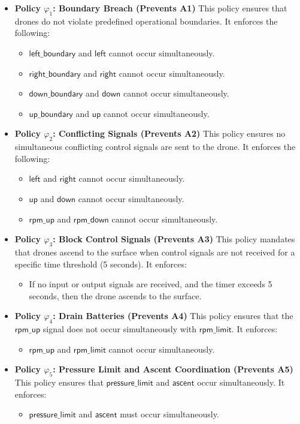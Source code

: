 \begin{itemize}
	\item \textbf{Policy $\varphi_1$: Boundary Breach (Prevents A1)}  
	This policy ensures that drones do not violate predefined operational boundaries. It enforces the following:
	\begin{itemize}
		\item $\mathsf{left\_boundary}$ and $\mathsf{left}$ cannot occur simultaneously.
		\item $\mathsf{right\_boundary}$ and $\mathsf{right}$ cannot occur simultaneously.
		\item $\mathsf{down\_boundary}$ and $\mathsf{down}$ cannot occur simultaneously.
		\item $\mathsf{up\_boundary}$ and $\mathsf{up}$ cannot occur simultaneously.
	\end{itemize}
	
	\item \textbf{Policy $\varphi_2$: Conflicting Signals (Prevents A2)}  
	This policy ensures no simultaneous conflicting control signals are sent to the drone. It enforces the following:
	\begin{itemize}
		\item $\mathsf{left}$ and $\mathsf{right}$ cannot occur simultaneously.
		\item $\mathsf{up}$ and $\mathsf{down}$ cannot occur simultaneously.
		\item $\mathsf{rpm\_up}$ and $\mathsf{rpm\_down}$ cannot occur simultaneously.
	\end{itemize}
	
	\item \textbf{Policy $\varphi_3$: Block Control Signals (Prevents A3)}  
	This policy mandates that drones ascend to the surface when control signals are not received for a specific time threshold (5 seconds). It enforces:
	\begin{itemize}
		\item If no input or output signals are received, and the timer exceeds 5 seconds, then the drone ascends to the surface.
	\end{itemize}
	
	\item \textbf{Policy $\varphi_4$: Drain Batteries (Prevents A4)}  
	This policy ensures that the $\mathsf{rpm\_up}$ signal does not occur simultaneously with $\mathsf{rpm\_limit}$. It enforces:
	\begin{itemize}
		\item $\mathsf{rpm\_up}$ and $\mathsf{rpm\_limit}$ cannot occur simultaneously.
	\end{itemize}
	
	\item \textbf{Policy $\varphi_5$: Pressure Limit and Ascent Coordination (Prevents A5)}  
	This policy ensures that $\mathsf{pressure\_limit}$ and $\mathsf{ascent}$ occur simultaneously. It enforces:
	\begin{itemize}
		\item $\mathsf{pressure\_limit}$ and $\mathsf{ascent}$ must occur simultaneously.
	\end{itemize}
\end{itemize}

